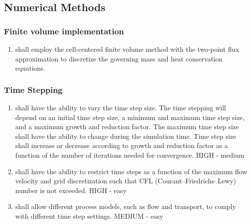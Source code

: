 \subsection{Numerical Methods}

\subsubsection{Finite volume implementation}
\begin{enumerate}
	\item \label{FVmethod} \pft shall employ the cell-centered finite volume method with the two-point flux approximation to discretize the governing mass and heat conservation equations.
\end{enumerate}

\subsubsection{Time Stepping}
\begin{enumerate}[resume]
	\item \label{NMvarTS} \pft shall have the ability to vary the time step size. 
	The time stepping will depend on an initial time step size, a minimum and maximum time step size, and a maximum growth and reduction factor. 
	The maximum time step size shall have the ability to change during the simulation time. 
	Time step size shall increase or decrease according to growth and reduction factor as a function of the number of iterations needed for convergence. HIGH - medium
	\item \label{TSbyCFL} \pft shall have the ability to restrict time steps as a function of the maximum flow velocity and grid discretization such that CFL (Courant–Friedrichs–Lewy) number is not exceeded. HIGH - easy
	\item \label{TSbyModel} \pft shall allow different process models, such as flow and transport, to comply with different time step settings. MEDIUM - easy
\end{enumerate}

